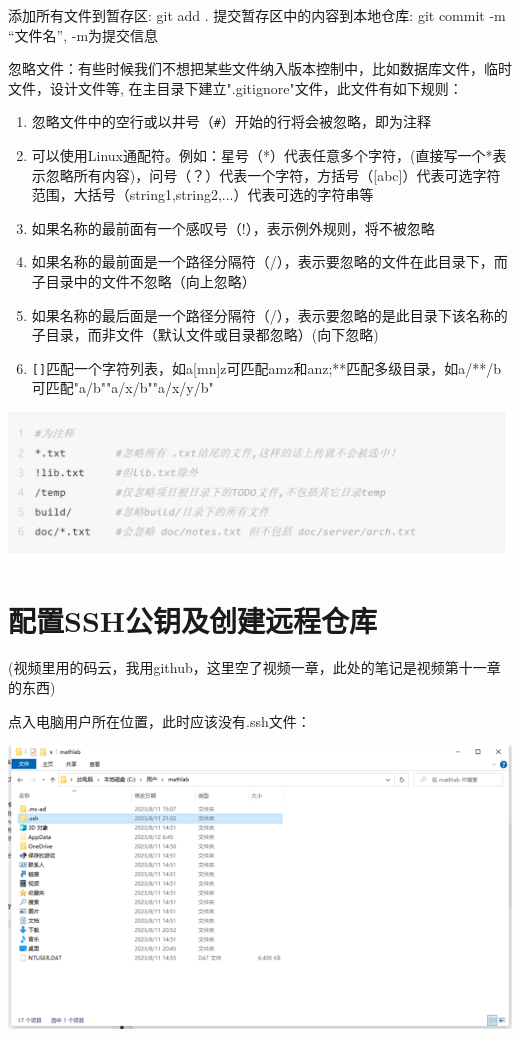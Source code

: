 \documentclass{article}
\begin{document}
添加所有文件到暂存区: git add .
提交暂存区中的内容到本地仓库: git commit -m “文件名”, -m为提交信息

忽略文件：有些时候我们不想把某些文件纳入版本控制中，比如数据库文件，临时文件，设计文件等, 在主目录下建立".gitignore"文件，此文件有如下规则：
\begin{enumerate}
    \item 忽略文件中的空行或以井号（\verb|#|）开始的行将会被忽略，即为注释
    \item 可以使用Linux通配符。例如：星号（*）代表任意多个字符，(直接写一个*表示忽略所有内容)，问号（？）代表一个字符，方括号（[abc]）代表可选字符范围，大括号（{string1,string2,...}）代表可选的字符串等
    \item 如果名称的最前面有一个感叹号（!），表示例外规则，将不被忽略
    \item 如果名称的最前面是一个路径分隔符（/），表示要忽略的文件在此目录下，而子目录中的文件不忽略（向上忽略）
    \item 如果名称的最后面是一个路径分隔符（/），表示要忽略的是此目录下该名称的子目录，而非文件（默认文件或目录都忽略）(向下忽略)
    \item \verb|[]|匹配一个字符列表，如a[mn]z可匹配amz和anz;**匹配多级目录，如a/**/b可匹配"a/b""a/x/b""a/x/y/b"
\end{enumerate}
\includegraphics{image/9.2.png}

\section{配置SSH公钥及创建远程仓库}
\begin{flushleft}
(视频里用的码云，我用github，这里空了视频一章，此处的笔记是视频第十一章的东西)

点入电脑用户所在位置，此时应该没有.ssh文件：   
\end{flushleft}


\includegraphics{image/10.1.png}
\end{document}
